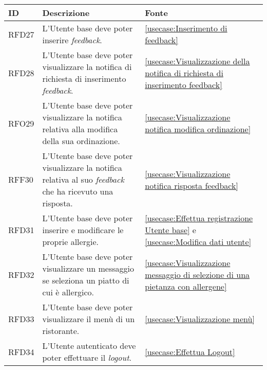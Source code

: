 \begin{table}[H]
	\renewcommand{\arraystretch}{1.5}
	\centering
	\begin{tabularx}{\textwidth}{l|X|p{2cm}}
		\textbf{ID} & \textbf{Descrizione}                                                                                                 & \textbf{Fonte}                                                                                \\
		\hline
		RFD27       & L'Utente base deve poter inserire \textit{feedback}.                                                                 & \autoref{usecase:Inserimento di feedback}                                                     \\
		\hline
		RFD28       & L'Utente base deve poter visualizzare la notifica di richiesta di inserimento \textit{feedback}.                     & \autoref{usecase:Visualizzazione della notifica di richiesta di inserimento feedback}         \\
		\hline
		RFO29       & L'Utente base deve poter visualizzare la notifica relativa alla modifica della sua ordinazione.                      & \autoref{usecase:Visualizzazione notifica modifica ordinazione}                               \\
		\hline
		RFF30       & L'Utente base deve poter visualizzare la notifica relativa al suo \textit{feedback} che ha ricevuto una risposta.    & \autoref{usecase:Visualizzazione notifica risposta feedback}                                  \\
		\hline
		RFD31       & L'Utente base deve poter inserire e modificare le proprie allergie.                                                  & \autoref{usecase:Effettua registrazione Utente base} e \autoref{usecase:Modifica dati utente} \\
		\hline
		RFD32       & L'Utente base deve poter visualizzare un messaggio se seleziona un piatto di cui è allergico.                        & \autoref{usecase:Visualizzazione messaggio di selezione di una pietanza con allergene}        \\
		\hline
		RFD33       & L'Utente base deve poter visualizzare il menù di un ristorante.                                                      & \autoref{usecase:Visualizzazione menù}                                                        \\
		\hline
		RFD34       & L'Utente autenticato deve poter effettuare il \textit{logout}.                                                       & \autoref{usecase:Effettua Logout}                                                             \\

\end{tabularx}
\end{table}
